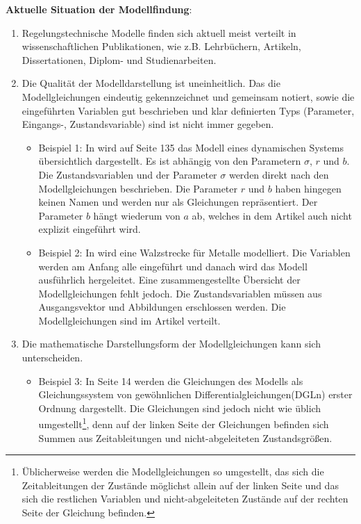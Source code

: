 \textbf{Aktuelle Situation der Modellfindung}: 
\begin{enumerate}
	\item Regelungstechnische Modelle finden sich aktuell meist verteilt in wissenschaftlichen Publikationen, wie z.B. Lehrbüchern, Artikeln, Dissertationen, Diplom- und Studienarbeiten.
	\item Die Qualität der Modelldarstellung ist uneinheitlich. Das die Modellgleichungen eindeutig gekennzeichnet und gemeinsam notiert, sowie die eingeführten Variablen gut beschrieben und klar definierten Typs (Parameter, Eingangs-, Zustandsvariable) sind ist nicht immer gegeben.
	\begin{itemize}[label=$\bullet$]
		\item Beispiel 1: In \cite{LOR63} wird auf Seite 135 das Modell eines dynamischen Systems übersichtlich dargestellt. Es ist abhängig von den Parametern $\sigma$, $r$ und $b$. Die Zustandsvariablen und der Parameter $\sigma$ werden direkt nach den Modellgleichungen beschrieben. Die Parameter $r$ und $b$ haben hingegen keinen Namen und werden nur als Gleichungen repräsentiert. Der Parameter $b$ hängt wiederum von $a$ ab, welches in dem Artikel auch nicht explizit eingeführt wird.
		\item Beispiel 2: In \cite{YIFREA09} wird eine Walzstrecke für Metalle modelliert. Die Variablen werden am Anfang alle eingeführt und danach wird das Modell ausführlich hergeleitet. Eine zusammengestellte Übersicht der Modellgleichungen fehlt jedoch. Die Zustandsvariablen müssen aus Ausgangsvektor und Abbildungen erschlossen werden. Die Modellgleichungen sind im Artikel verteilt.
	\end{itemize}
	\item Die mathematische Darstellungsform der Modellgleichungen kann sich unterscheiden.
	\begin{itemize}[label=$\bullet$]
		\item Beispiel 3: In \cite{SILEEA12} Seite 14 werden die Gleichungen des Modells als Gleichungssystem von gewöhnlichen Differentialgleichungen(DGLn) erster Ordnung dargestellt. Die Gleichungen sind jedoch nicht wie üblich umgestellt\footnote{Üblicherweise werden die Modellgleichungen so umgestellt, das sich die Zeitableitungen der Zustände möglichst allein auf der linken Seite und das sich die restlichen Variablen und nicht-abgeleiteten Zustände auf der rechten Seite der Gleichung befinden.}, denn auf der linken Seite der Gleichungen befinden sich Summen aus Zeitableitungen und nicht-abgeleiteten Zustandsgrößen.

\end{itemize}
\end{enumerate}
